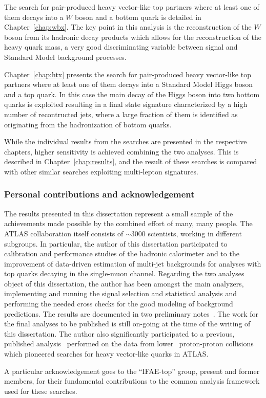 The search for pair-produced heavy vector-like top partners
where at least one of them decays into a $W$ boson and a bottom
quark is detailed in Chapter~\ref{chap:wbx}. The key point in
this analysis is the reconstruction of the $W$ boson from its
hadronic decay products which allows for the reconstruction
of the heavy quark mass, a very good discriminating variable between
signal and Standard Model background processes.

Chapter~\ref{chap:htx} presents the search for 
pair-produced heavy vector-like top partners
where at least one of them decays into a Standard Model Higgs
boson and a top quark. In this case the main decay of the Higgs
boson into two bottom quarks is exploited resulting in a
final state signature characterized by a high number of recontructed
jets, where a large fraction of them is identified as originating
from the hadronization of bottom quarks.

While the individual results from the searches
are presented in the respective chapters, higher
sensitivity is achieved combining the two analyses.
This is described in Chapter~\ref{chap:results},
and the result of these searches is compared with
other similar searches exploiting multi-lepton signatures.






\subsubsection*{Personal contributions and acknowledgement}

The results presented in this dissertation represent
a small sample of the achievements made possible by
the combined effort of many, many people. The ATLAS
collaboration itself consists of $\sim$3000 scientists,
working in different subgroups. In particular,
the author of this dissertation participated to calibration
and performance studies of the hadronic calorimeter
and to the improvement of data-driven estimation of
multi-jet backgrounds for analyses with top quarks 
decaying in the single-muon channel. Regarding
the two analyses object of this dissertation, the author
has been amongst the main analyzers, implementing and
running the signal selection and statistical analysis and
performing the needed cross checks for the good modeling
of background predictions. %
The results are documented in two preliminary 
notes~\cite{ATLAS-CONF-2013-060,ATLAS-CONF-2013-018}.
The work for the final analyses to be published is still on-going at
the time of the writing of this dissertation.
The author also significantly participated to a previous,
published analysis~\cite{ATLAS:2012qe}
performed on the data from lower \cme\ 
proton-proton collisions which pioneered searches for
heavy vector-like quarks in ATLAS.

A particular acknowledgement goes to the ``IFAE-top''
group, present and former members, for their fundamental
contributions to the common analysis framework used
for these searches.
